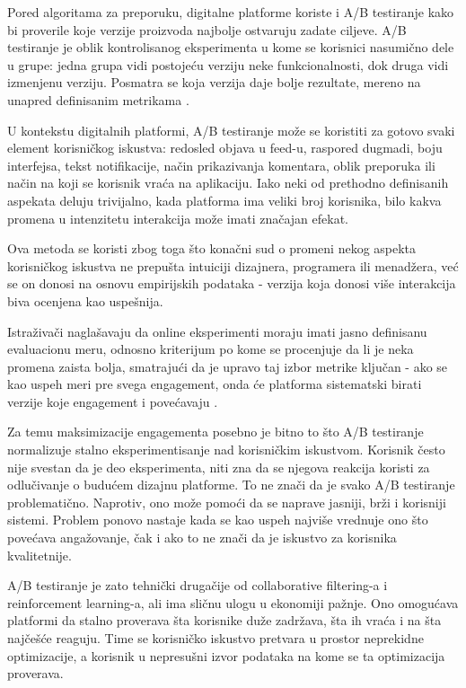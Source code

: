 Pored algoritama za preporuku, digitalne platforme koriste i A/B testiranje kako bi proverile koje verzije proizvoda najbolje ostvaruju zadate ciljeve. A/B testiranje je oblik kontrolisanog eksperimenta u kome se korisnici nasumično dele u grupe: jedna grupa vidi postojeću verziju neke funkcionalnosti, dok druga vidi izmenjenu verziju. Posmatra se koja verzija daje bolje rezultate, mereno na unapred definisanim metrikama \cite{kohavi2017online}.

U kontekstu digitalnih platformi, A/B testiranje može se koristiti za gotovo svaki element korisničkog iskustva:  redosled objava u feed-u, raspored dugmadi, boju interfejsa, tekst notifikacije, način prikazivanja komentara, oblik preporuka ili način na koji se korisnik vraća na aplikaciju. Iako neki od prethodno definisanih aspekata deluju trivijalno, kada platforma ima veliki broj korisnika, bilo kakva promena u intenzitetu interakcija može imati značajan efekat.

Ova metoda se koristi zbog toga što konačni sud o promeni nekog aspekta korisničkog iskustva ne prepušta intuiciji dizajnera, programera ili menadžera, već se on donosi na osnovu empirijskih podataka - verzija koja donosi više interakcija biva ocenjena kao uspešnija.

Istraživači naglašavaju da online eksperimenti moraju imati jasno definisanu evaluacionu meru, odnosno kriterijum po kome se procenjuje da li je neka promena zaista bolja, smatrajući da je upravo taj izbor metrike ključan - ako se kao uspeh meri pre svega engagement, onda će platforma sistematski birati verzije koje engagement i povećavaju \cite{kohavi2017online}.

Za temu maksimizacije engagementa posebno je bitno to što A/B testiranje normalizuje stalno eksperimentisanje nad korisničkim iskustvom. Korisnik često nije svestan da je deo eksperimenta, niti zna da se njegova reakcija koristi za odlučivanje o budućem dizajnu platforme. To ne znači da je svako A/B testiranje problematično. Naprotiv, ono može pomoći da se naprave jasniji, brži i korisniji sistemi. Problem ponovo nastaje kada se kao uspeh najviše vrednuje ono što povećava angažovanje, čak i ako to ne znači da je iskustvo za korisnika kvalitetnije.

A/B testiranje je zato tehnički drugačije od collaborative filtering-a i reinforcement learning-a, ali ima sličnu ulogu u ekonomiji pažnje. Ono omogućava platformi da stalno proverava šta korisnike duže zadržava, šta ih vraća i na šta najčešće reaguju. Time se korisničko iskustvo pretvara u prostor neprekidne optimizacije, a korisnik u nepresušni izvor podataka na kome se ta optimizacija proverava.

